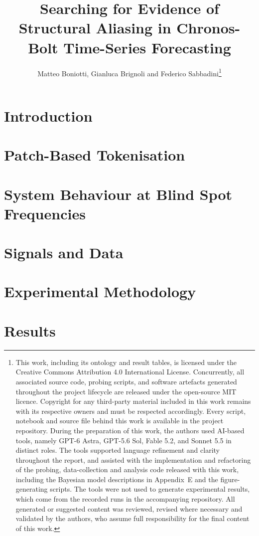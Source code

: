 \documentclass[
letterpaper, %
10pt, %
twoside, %
]{LTJournalArticle}
\title{Searching for Evidence of Structural Aliasing in Chronos-Bolt Time-Series Forecasting} %
\author{ Matteo Boniotti, Gianluca Brignoli and Federico Sabbadini\thanks{This work, including its ontology and result tables, is licensed under the Creative Commons Attribution 4.0 International License. Concurrently, all associated source code, probing scripts, and software artefacts generated throughout the project lifecycle are released under the open-source MIT licence. \newline Copyright for any third-party material included in this work remains with its respective owners and must be respected accordingly. Every script, notebook and source file behind this work is available in the project repository\autocite{brignoliPatchAliasingRepository2026}. \newline \mbox{}\newline During the preparation of this work, the authors used AI-based tools, namely GPT-6 Astra, GPT-5.6 Sol, Fable 5.2, and Sonnet 5.5 in distinct roles. The tools supported language refinement and clarity throughout the report, and assisted with the implementation and refactoring of the probing, data-collection and analysis code released with this work, including the Bayesian model descriptions in Appendix~E and the figure-generating scripts. The tools were not used to generate experimental results, which come from the recorded runs in the accompanying repository. All generated or suggested content was reviewed, revised where necessary and validated by the authors, who assume full responsibility for the final content of this work.} }
\begin{document}
\maketitle

\flushbottom
{}

\newpage
\section*{Introduction}\label{sec:introduction}


\section{Patch-Based Tokenisation}\label{sec:tokenisation}


\section{System Behaviour at Blind Spot Frequencies}\label{sec:agent}


\section{Signals and Data}\label{sec:signals}


\section{Experimental Methodology}\label{sec:methodology}


\section{Results}\label{sec:results}

\end{document}
